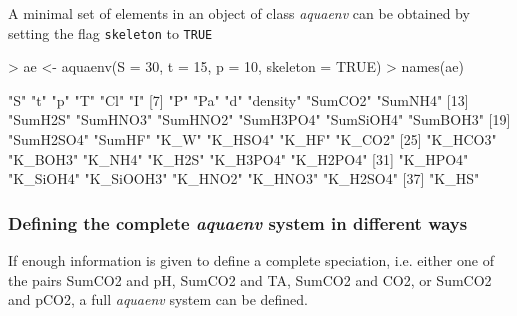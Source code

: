 \documentclass[article,nojss]{jss}
\begin{document}
A minimal set of elements in an object of class \textit{aquaenv} can be obtained by setting the flag \texttt{skeleton} to \texttt{TRUE}

\begin{Schunk}
\begin{Sinput}
> ae <- aquaenv(S = 30, t = 15, p = 10, skeleton = TRUE)
> names(ae)
\end{Sinput}
\begin{Soutput}
 [1] "S"        "t"        "p"        "T"        "Cl"       "I"       
 [7] "P"        "Pa"       "d"        "density"  "SumCO2"   "SumNH4"  
[13] "SumH2S"   "SumHNO3"  "SumHNO2"  "SumH3PO4" "SumSiOH4" "SumBOH3" 
[19] "SumH2SO4" "SumHF"    "K_W"      "K_HSO4"   "K_HF"     "K_CO2"   
[25] "K_HCO3"   "K_BOH3"   "K_NH4"    "K_H2S"    "K_H3PO4"  "K_H2PO4" 
[31] "K_HPO4"   "K_SiOH4"  "K_SiOOH3" "K_HNO2"   "K_HNO3"   "K_H2SO4" 
[37] "K_HS"    
\end{Soutput}
\end{Schunk}



\subsubsection{Defining the complete \textit{aquaenv} system in different ways}
If enough information is given to define a complete speciation, i.e. either one of the pairs
SumCO2 and pH, SumCO2 and TA, SumCO2 and CO2, or SumCO2 and pCO2, 
a full \textit{aquaenv} system can be defined.
\end{document}
